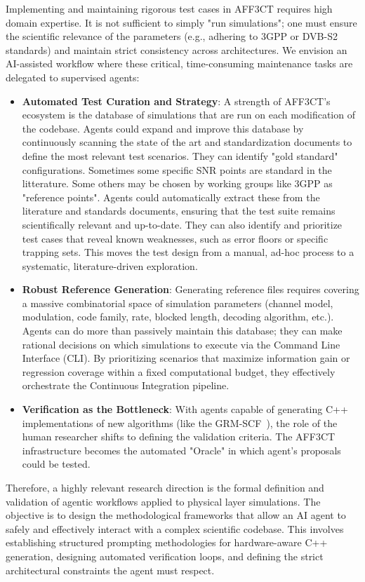 \documentclass[11pt]{report}
\begin{document}
Implementing and maintaining rigorous test cases in AFF3CT requires high domain expertise. It is not sufficient to simply "run simulations"; one must ensure the scientific relevance of the parameters (e.g., adhering to 3GPP or DVB-S2 standards) and maintain strict consistency across architectures. We envision an AI-assisted workflow where these critical, time-consuming maintenance tasks are delegated to supervised agents:

\begin{itemize}
  \item \textbf{Automated Test Curation and Strategy}: A strength of AFF3CT's ecosystem is the database of simulations that are run on each modification of the codebase. Agents could expand and improve this database by continuously scanning the state of the art and standardization documents to define the most relevant test scenarios. They can identify "gold standard" configurations. Sometimes some specific SNR points are standard in the litterature. Some others may be chosen by working groups like 3GPP as "reference points". Agents could automatically extract these from the literature and standards documents, ensuring that the test suite remains scientifically relevant and up-to-date. They can also identify and prioritize test cases that reveal known weaknesses, such as error floors or specific trapping sets. This moves the test design from a manual, ad-hoc process to a systematic, literature-driven exploration.
  \item \textbf{Robust Reference Generation}: Generating reference files requires covering a massive combinatorial space of simulation parameters (channel model, modulation, code family, rate, blocked length, decoding algorithm, etc.). Agents can do more than passively maintain this database; they can make rational decisions on which simulations to execute via the Command Line Interface (CLI). By prioritizing scenarios that maximize information gain or regression coverage within a fixed computational budget, they effectively orchestrate the Continuous Integration pipeline.
  \item \textbf{Verification as the Bottleneck}: With agents capable of generating C++ implementations of new algorithms (like the GRM-SCF~\cite{Sagitov2025}), the role of the human researcher shifts to defining the validation criteria. The AFF3CT infrastructure becomes the automated "Oracle" in which agent's proposals could be tested.
\end{itemize}

Therefore, a highly relevant research direction is the formal definition and validation of agentic workflows applied to physical layer simulations. The objective is to design the methodological frameworks that allow an AI agent to safely and effectively interact with a complex scientific codebase. This involves establishing structured prompting methodologies for hardware-aware C++ generation, designing automated verification loops, and defining the strict architectural constraints the agent must respect.
\end{document}
